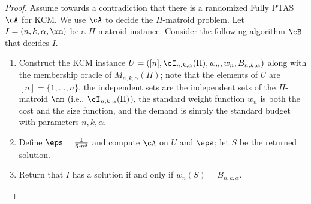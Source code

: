 	\begin{proof}
		Assume towards a contradiction that there is a randomized Fully PTAS $\cA$ for KCM. We use $\cA$ to decide the $\Pi$-matroid problem.  Let $I = \left(n,k,\alpha,\mm\right)$ be a $\Pi$-matroid instance. Consider the following algorithm $\cB$ that decides $I$.
		\begin{enumerate}
			\item Construct the KCM instance $%
			U= ([n],\cI_{n,k,\alpha}(\Pi),w_{n},w_{n},B_{n,k,\alpha})$ along with the membership oracle of $M_{n,k,\alpha}(\Pi)$; note that the elements of $U$ are $[n] = \{1,\ldots, n \}$, the independent sets are the independent sets of the $\Pi$-matroid $\mm$ (i.e., $\cI_{n,k,\alpha}(\Pi)$), the standard weight function $w_n$ is both the cost and the size function, and the demand is simply the standard budget with parameters $n,k,\alpha$. %
			\item Define $\eps = \frac{1}{6 \cdot n^3}$ and compute $\cA$ on $U$ and $\eps$; let $S$ be the returned solution.  
			\item Return that $I$ has a solution if and only if $w_n(S) = B_{n,k,\alpha}$. 
		\end{enumerate}
		

\end{proof}
